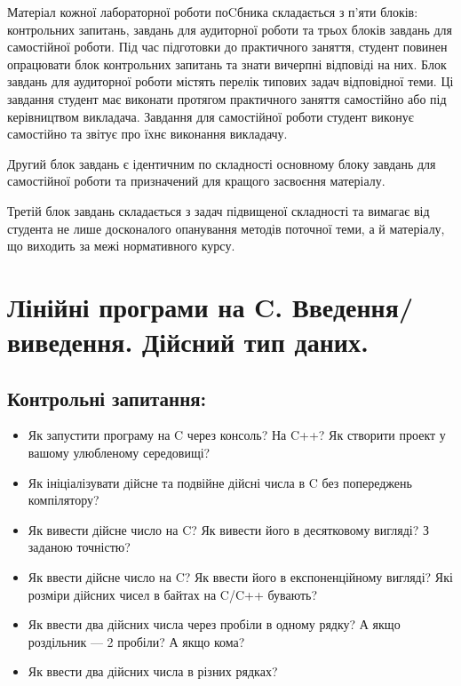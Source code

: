 \documentclass[a5paper,titlepage,openany,twoside,draft]{book_unv}%
\begin{document}
Матеріал кожної лабораторної роботи поCбника складається з п'яти
блоків: контрольних запитань, завдань для аудиторної роботи та трьох
блоків завдань для самостійної роботи. Під час підготовки до практичного
заняття, студент повинен опрацювати блок контрольних запитань та знати
вичерпні відповіді на них. Блок завдань для аудиторної роботи містять перелік
типових задач відповідної теми. Ці завдання студент має виконати
протягом практичного заняття самостійно або під керівництвом викладача.
Завдання для самостійної роботи студент виконує самостійно та звітує про
їхнє виконання викладачу. 

Другий блок завдань є ідентичним по складності основному блоку завдань
для самостійної роботи та призначений для кращого засвоєння матеріалу.

Третій блок завдань складається з задач підвищеної складності та вимагає
від студента не лише досконалого опанування методів поточної теми, а й
матеріалу, що виходить за межі нормативного курсу.


\chapter{ Лінійні програми на C. Введення/виведення. Дійсний тип даних. }
%

\section{Контрольні запитання:}

\begin{itemize}
\item
Як запустити програму на C через консоль? На C++? Як створити
проект у вашому улюбленому середовищі?
\item
Як ініціалізувати дійсне та подвійне дійсні числа в C без попереджень 
компілятору? 

\item
Як вивести дійсне число на C? Як вивести його в десятковому вигляді?
З заданою точністю?

\item
Як ввести дійсне число на C? Як ввести його в
експоненційному вигляді? Які розміри дійсних чисел в байтах на C/C++
бувають?

\item
  Як ввести два дійсних числа через пробіли в одному рядку? А якщо
  роздільник --- 2 пробіли? А якщо кома?
\item
  Як ввести два дійсних числа в різних рядках?

\end{itemize}
\end{document}
